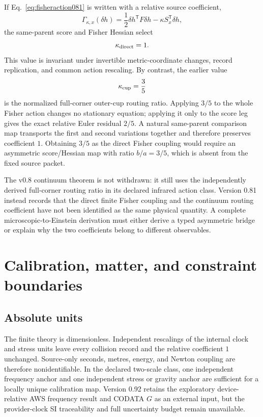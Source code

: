 \documentclass[11pt]{article}
\theoremstyle{definition}
\theoremstyle{remark}
\begin{document}
If Eq.~\eqref{eq:fisheraction081} is written with a relative source coefficient,
\begin{equation}
 \Gamma_{\kappa,x}(\delta h)
 =\frac12\delta h^{\mathsf T}F\delta h
 -\kappa S_x^{\mathsf T}\delta h,
\end{equation}
the same-parent score and Fisher Hessian select
\begin{equation}
 \kappa_{\rm direct}=1.
\end{equation}
This value is invariant under invertible metric-coordinate changes, record replication, and common action rescaling. By contrast, the earlier value
\begin{equation}
 \kappa_{\rm cup}=\frac35
\end{equation}
is the normalized full-corner outer-cup routing ratio. Applying $3/5$ to the whole Fisher action changes no stationary equation; applying it only to the score leg gives the exact relative Euler residual $2/5$. A natural same-parent comparison map transports the first and second variations together and therefore preserves coefficient $1$. Obtaining $3/5$ as the direct Fisher coupling would require an asymmetric score/Hessian map with ratio $b/a=3/5$, which is absent from the fixed source packet.

The v0.8 continuum theorem is not withdrawn: it still uses the independently derived full-corner routing ratio in its declared infrared action class. Version 0.81 instead records that the direct finite Fisher coupling and the continuum routing coefficient have not been identified as the same physical quantity. A complete microscopic-to-Einstein derivation must either derive a typed asymmetric bridge or explain why the two coefficients belong to different observables.

\section{Calibration, matter, and constraint boundaries}\label{sec:boundaries081}

\subsection{Absolute units}

The finite theory is dimensionless. Independent rescalings of the internal clock and stress units leave every collision record and the relative coefficient $1$ unchanged. Source-only seconds, metres, energy, and Newton coupling are therefore nonidentifiable. In the declared two-scale class, one independent frequency anchor and one independent stress or gravity anchor are sufficient for a locally unique calibration map. Version 0.92 retains the exploratory device-relative AWS frequency result and CODATA $G$ as an external input, but the provider-clock SI traceability and full uncertainty budget remain unavailable.
\end{document}

